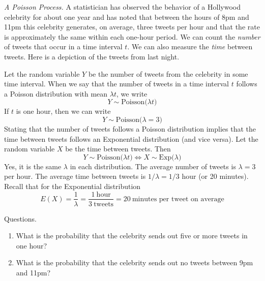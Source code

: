 \emph{A Poisson Process.} A statistician has observed the behavior of
a Hollywood celebrity for about one year and has noted that between
the hours of 8pm and 11pm this celebrity generates, on average, three
tweets per hour and that the rate is approximately the same within
each one-hour period.  We can count the \emph{number} of tweets that
occur in a time interval $t$. We can also measure the \emph{time}
between tweets. Here is a depiction of the tweets from last night.

\vspace{.2in}
\begin{center}
\end{center}

Let the random variable $Y$ be the number of tweets from
the celebrity in some time interval.
When we say that the number of tweets in a time interval $t$ follows
a Poisson distribution with mean $\lambda t$, we write
\[
  Y \sim \text{Poisson($\lambda t$)}
\]
If $t$ is one hour, then we can write
\[
  Y \sim \text{Poisson($\lambda = 3$)}
\]
Stating that the number of tweets follows a Poisson distribution
implies that the time between tweets follows an Exponential
distribution (and vice versa). Let the random variable $X$ be
the time between tweets. Then
\[
  Y \sim \text{Poisson($\lambda t$)} \Longleftrightarrow X \sim \text{Exp($\lambda$)}
\]
Yes, it is the same $\lambda$ in each distribution.
The average number of tweets is $\lambda=3$ per hour. The average
time between tweets is $1/\lambda = 1/3$ hour (or 20 minutes).
Recall that for the Exponential distribution
\[
  E(X) = \frac{1}{\lambda} = \frac{1~\text{hour}}{3~\text{tweets}} = 20 ~\text{minutes per tweet on average}
\]

Questions.
\begin{enumerate}
\item What is the probability that the celebrity sends out five or
  more tweets in one hour?
\item What is the probability that the celebrity sends out
  no tweets between 9pm and 11pm?
\end{enumerate}


